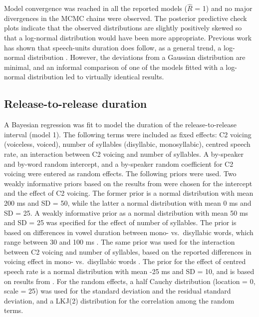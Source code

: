 \documentclass[
  12pt,
  a4paper,
]{article}
\begin{document}
Model convergence was reached in all the reported models (\(\hat{R}\) =
1) and no major divergences in the MCMC chains were observed. The
posterior predictive check plots indicate that the observed
distributions are slightly positively skewed so that a log-normal
distribution would have been more appropriate. Previous work has shown
that speech-units duration does follow, as a general trend, a log-normal
distribution \citep{rosen2005, ratnikova2017}. However, the deviations
from a Gaussian distribution are minimal, and an informal comparison of
one of the models fitted with a log-normal distribution led to virtually
identical results.

\hypertarget{release-to-release-duration}{%
\subsection{Release-to-release
duration}\label{release-to-release-duration}}

\label{s:rr}

A Bayesian regression was fit to model the duration of the
release-to-release interval (model 1). The following terms were included
as fixed effects: C2 voicing (voiceless, voiced), number of syllables
(disyllabic, monosyllabic), centred speech rate, an interaction between
C2 voicing and number of syllables. A by-speaker and by-word random
intercept, and a by-speaker random coefficient for C2 voicing were
entered as random effects. The following priors were used. Two weakly
informative priors based on the results from \citet{coretta2018j} were
chosen for the intercept and the effect of C2 voicing. The former prior
is a normal distribution with mean 200 ms and SD = 50, while the latter
a normal distribution with mean 0 ms and SD = 25. A weakly informative
prior as a normal distribution with mean 50 ms and SD = 25 was specified
for the effect of number of syllables. The prior is based on differences
in vowel duration between mono- vs.~disyllabic words, which range
between 30 and 100 ms \citep{sharf1962, klatt1973}. The same prior was
used for the interaction between C2 voicing and number of syllables,
based on the reported differences in voicing effect in mono-
vs.~disyllabic words \citep{sharf1962, klatt1973}. The prior for the
effect of centred speech rate is a normal distribution with mean -25 ms
and SD = 10, and is based on results from \citet{coretta2018j}. For the
random effects, a half Cauchy distribution (location = 0, scale = 25)
was used for the standard deviation and the residual standard deviation,
and a LKJ(2) distribution for the correlation among the random terms.
\end{document}
